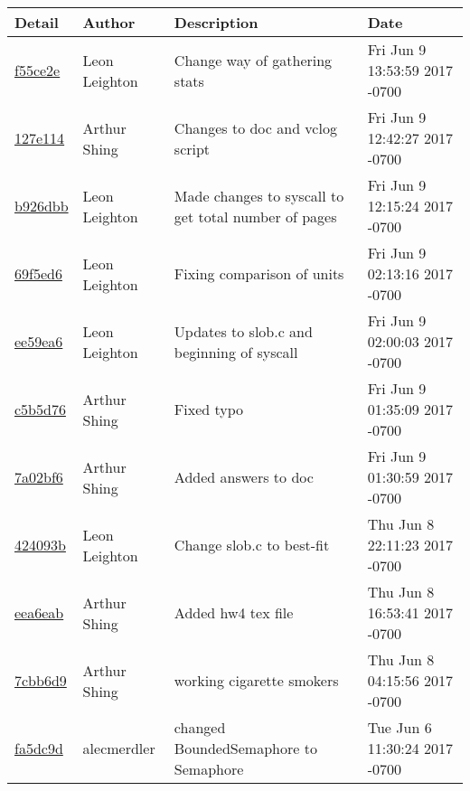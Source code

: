 \begin{tabular}{l l l l}\textbf{Detail} & \textbf{Author} & \textbf{Description} & \textbf{Date}\\\hline
\href{https://github.com/alecmerdler/cs-444-group-119/commit/f55ce2e36853dfbdd52bed59cfa2ce43df645ed3}{f55ce2e} & Leon Leighton & Change way of gathering stats & Fri Jun 9 13:53:59 2017 -0700\\\hline
\href{https://github.com/alecmerdler/cs-444-group-119/commit/127e114c2a48cf4896cfb1b315297ece28c49e9a}{127e114} & Arthur Shing & Changes to doc and vclog script & Fri Jun 9 12:42:27 2017 -0700\\\hline
\href{https://github.com/alecmerdler/cs-444-group-119/commit/b926dbbf8686c2cd06d0a6a08ef449f8da4a1d3b}{b926dbb} & Leon Leighton & Made changes to syscall to get total number of pages & Fri Jun 9 12:15:24 2017 -0700\\\hline
\href{https://github.com/alecmerdler/cs-444-group-119/commit/69f5ed6b069d281e822cf1e43773cb847eb869ac}{69f5ed6} & Leon Leighton & Fixing comparison of units & Fri Jun 9 02:13:16 2017 -0700\\\hline
\href{https://github.com/alecmerdler/cs-444-group-119/commit/ee59ea6a380cd3042481a5bb41c9cfc9c06d01c7}{ee59ea6} & Leon Leighton & Updates to slob.c and beginning of syscall & Fri Jun 9 02:00:03 2017 -0700\\\hline
\href{https://github.com/alecmerdler/cs-444-group-119/commit/c5b5d76787fd467cb08813cdd5c84f8109bc9f5b}{c5b5d76} & Arthur Shing & Fixed typo & Fri Jun 9 01:35:09 2017 -0700\\\hline
\href{https://github.com/alecmerdler/cs-444-group-119/commit/7a02bf6ba44b86597443b726e837b34e8121e113}{7a02bf6} & Arthur Shing & Added answers to doc & Fri Jun 9 01:30:59 2017 -0700\\\hline
\href{https://github.com/alecmerdler/cs-444-group-119/commit/424093b9831ffbbcce981e57958bbab72e65e54e}{424093b} & Leon Leighton & Change slob.c to best-fit & Thu Jun 8 22:11:23 2017 -0700\\\hline
\href{https://github.com/alecmerdler/cs-444-group-119/commit/eea6eab255a3a63eacbd486315f8270b52d2e080}{eea6eab} & Arthur Shing & Added hw4 tex file & Thu Jun 8 16:53:41 2017 -0700\\\hline
\href{https://github.com/alecmerdler/cs-444-group-119/commit/7cbb6d989006f504db0136fea5da32d500147e53}{7cbb6d9} & Arthur Shing & working cigarette smokers & Thu Jun 8 04:15:56 2017 -0700\\\hline
\href{https://github.com/alecmerdler/cs-444-group-119/commit/fa5dc9df5a990f40c8a55aea751347c8a07ace96}{fa5dc9d} & alecmerdler & changed BoundedSemaphore to Semaphore & Tue Jun 6 11:30:24 2017 -0700\\\hline

\end{tabular}
